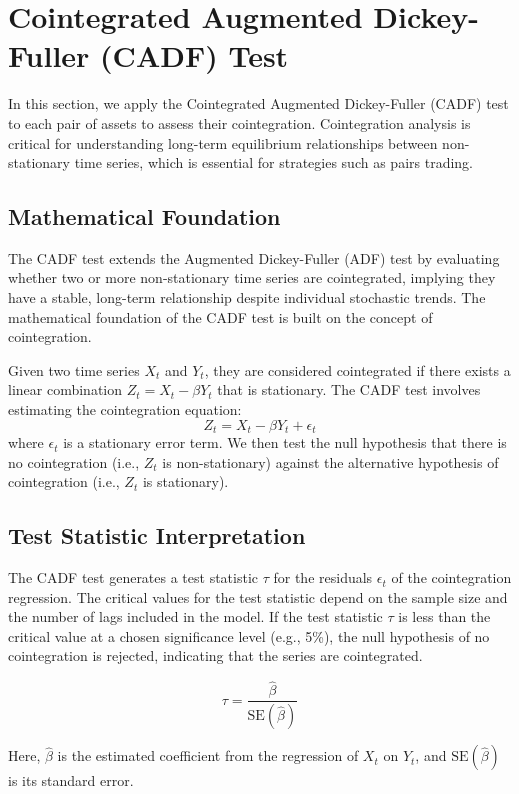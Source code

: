 \documentclass{article}
\begin{document}
\section*{Cointegrated Augmented Dickey-Fuller (CADF) Test}
In this section, we apply the Cointegrated Augmented Dickey-Fuller (CADF) test to each pair of assets to assess their cointegration. Cointegration analysis is critical for understanding long-term equilibrium relationships between non-stationary time series, which is essential for strategies such as pairs trading.

\subsection{Mathematical Foundation}
The CADF test extends the Augmented Dickey-Fuller (ADF) test by evaluating whether two or more non-stationary time series are cointegrated, implying they have a stable, long-term relationship despite individual stochastic trends. The mathematical foundation of the CADF test is built on the concept of cointegration.

Given two time series \( X_t \) and \( Y_t \), they are considered cointegrated if there exists a linear combination \( Z_t = X_t - \beta Y_t \) that is stationary. The CADF test involves estimating the cointegration equation:
\[
Z_t = X_t - \beta Y_t + \epsilon_t
\]
where \( \epsilon_t \) is a stationary error term. We then test the null hypothesis that there is no cointegration (i.e., \( Z_t \) is non-stationary) against the alternative hypothesis of cointegration (i.e., \( Z_t \) is stationary).

\subsection{Test Statistic Interpretation}
The CADF test generates a test statistic \( \tau \) for the residuals \( \epsilon_t \) of the cointegration regression. The critical values for the test statistic depend on the sample size and the number of lags included in the model. If the test statistic \( \tau \) is less than the critical value at a chosen significance level (e.g., 5\%), the null hypothesis of no cointegration is rejected, indicating that the series are cointegrated.

\[
\tau = \frac{\hat{\beta}}{\text{SE}(\hat{\beta})}
\]

Here, \( \hat{\beta} \) is the estimated coefficient from the regression of \( X_t \) on \( Y_t \), and \( \text{SE}(\hat{\beta}) \) is its standard error.
\end{document}

